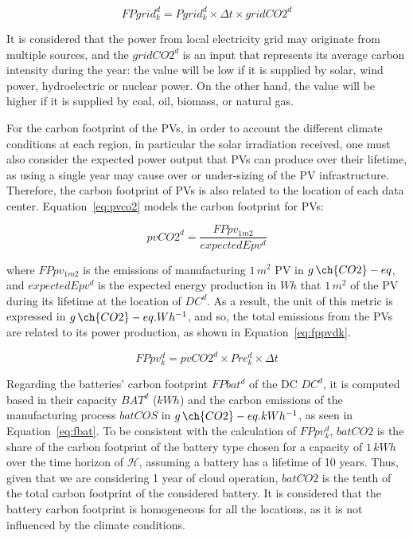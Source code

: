\begin{equation} \label{eq:fpgrid}
FPgrid_k^d = Pgrid_k^d\times \Delta t \times gridCO2^d
\end{equation}

It is considered that the power from local electricity grid may originate from multiple sources, and the $gridCO2^d$ is an input that represents its average carbon intensity during the year: the value will be low if it is supplied by solar, wind power, hydroelectric or nuclear power. On the other hand, the value will be higher if it is supplied by coal, oil, biomass, or natural gas.

For the carbon footprint of the PVs, in order to account the different climate conditions at each region, in particular the solar irradiation received, one must also consider the expected power output that PVs can produce over their lifetime, as using a single year may cause over or under-sizing of the PV infrastructure. Therefore, the carbon footprint of PVs is also related to the location of each data center. Equation~\eqref{eq:pvco2} models the carbon footprint for PVs:

\begin{equation} \label{eq:pvco2}
   pvCO2^d =  \frac{FPpv_{1m2}}{expectedEpv^d} 
\end{equation}

where $FPpv_{1m2}$ is the emissions of manufacturing $1\,m^2$ PV in $g\,\ch{CO2}-eq$, and $expectedEpv^d$ is the expected energy production in $Wh$ that $1\,m^2$ of the PV during its lifetime at the location of $DC^d$. As a result, the unit of this metric is expressed in $g\,\ch{CO2}-eq.Wh^{-1}$, and so, the total emissions from the PVs are related to its power production, as shown in Equation~\eqref{eq:fppvdk}. 

\begin{equation} \label{eq:fppvdk}
   FPpv^d_k =  pvCO2^d \times Pre_k^d \times \Delta t
\end{equation}


Regarding the batteries' carbon footprint $FPbat^d$ of the DC $DC^d$, it is computed based in their capacity $BAT^d$ ($kWh$) and the carbon emissions of the manufacturing process $batCOS$ in $g\,\ch{CO2}-eq.kWh^{-1}$, as seen in Equation~\eqref{eq:fbat}. To be consistent with the calculation of $FPpv^d_k$, $batCO2$ is the share of the carbon footprint of the battery type chosen for a capacity of $1\,kWh$ over the time horizon of $\mathcal{H}$, assuming a battery has a lifetime of 10 years.  Thus, given that we are considering 1 year of cloud operation, $batCO2$ is the tenth of the total carbon footprint of the considered battery. It is considered that the battery carbon footprint is homogeneous for all the locations, as it is not influenced by the climate conditions.


